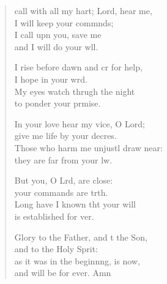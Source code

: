 \settowidth{\versewidth}{I call with all my heart; Lord, hear me, *}
\begin{verse}%
  \begin{patverse}
     call with all my hart; Lord, hear me,\Med\\
I will keep your commnds;\\
I call upn you, save me\Med\\
and I will do your w\pointup{\i}ll.

I rise before dawn and cr for help,\Med\\
I hope in your wrd.\\
My eyes watch thrugh the night\Med\\
to ponder your prmise.

In your love hear my vice, O Lord;\Med\\
give me life by your decres.\\
Those who harm me unjustl draw near:\Med\\
they are far from your lw.

But you, O Lrd, are close:\Med\\
your commands are trth.\\
Long have I known tht your will\Med\\
is established for ver.

Glory to the Father, and t the Son,\Med\\
and to the Holy Sp\pointup{\i}rit:\\
as it was in the beginn\pointup{\i}ng, is now,\Med\\
and will be for ever. Amn
  \end{patverse}
\end{verse}
